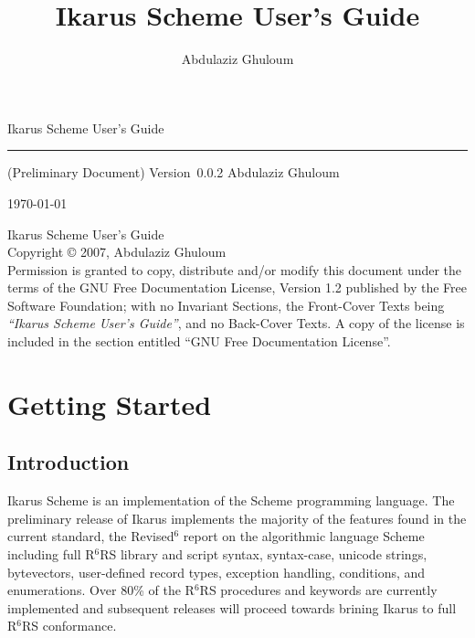 \documentclass[onecolumn, 12pt, twoside, openright, dvipdfm]{book}
\newcommand{\rnrs}[1]{R$^{\mathrm{#1}}$RS}
\begin{document}
\frontmatter

\VerbatimFootnotes

\title{Ikarus Scheme User's Guide}

\author{Abdulaziz Ghuloum}

\pagestyle{empty}

\mbox{}
\vspace{3in}

{
\fontsize{66}{66}
\begin{center}
Ikarus Scheme User's Guide
\end{center} 
}
\noindent
\rule{\textwidth}{6pt} 
{\fontsize{18}{18}
\hfill{}
(Preliminary Document)
\hfill Version~0.0.2
}
\vfill
{
\fontsize{24}{24}
\hfill{} Abdulaziz Ghuloum
}

{
\fontsize{18}{18}
\hfill{} \today
}

\newpage
\mbox{}
\vfill{}
\noindent
Ikarus Scheme User's Guide\\
Copyright \copyright{} 2007,  Abdulaziz Ghuloum\\

\noindent
Permission is granted to copy, distribute and/or modify this
document under the terms of the GNU Free Documentation License,
Version 1.2 published by the Free Software
Foundation; with no Invariant Sections, the Front-Cover Texts
being \emph{``Ikarus Scheme User's Guide''}, and
no Back-Cover Texts.  A copy of the license is included in the
section entitled ``GNU Free Documentation License''.

\newpage

\pagestyle{fancy}
\tableofcontents

\newpage

\mainmatter
\setlength{\parindent}{0pt} 
\setlength{\parskip}{2.0ex plus 0ex minus 0ex}
\chapter{Getting Started}
\section{Introduction}

Ikarus Scheme is an implementation of the Scheme programming
language.  The preliminary release of Ikarus implements the majority
of the features found in the current standard, the
Revised$^\mathrm{6}$ report on the algorithmic language
Scheme\cite{r6rs} including full \rnrs{6} library and script syntax,
syntax-case, unicode strings, bytevectors, user-defined record
types, exception handling, conditions, and enumerations.  Over 80\%
of the \rnrs{6} procedures and keywords are currently implemented
and subsequent releases will proceed towards brining Ikarus to full
\rnrs{6} conformance.
\end{document}
